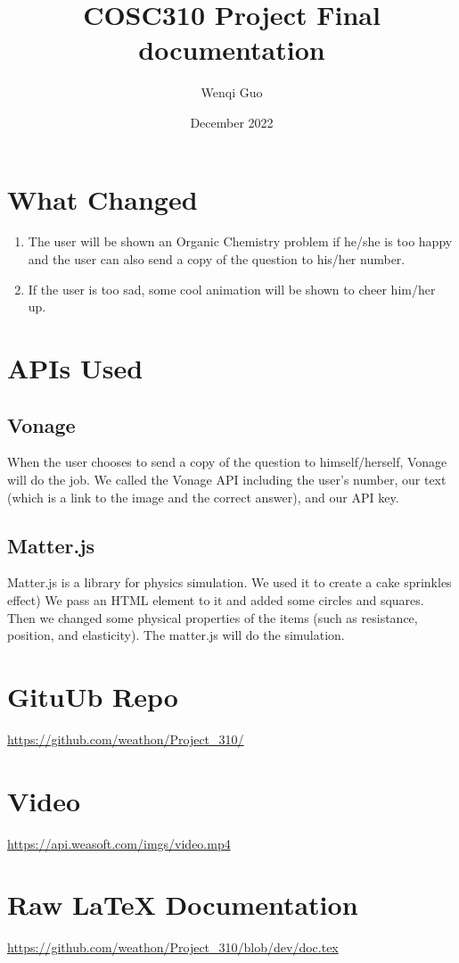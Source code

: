 \documentclass{article}
\title{COSC310 Project Final documentation}
\author{Wenqi Guo}
\date{December 2022}
\begin{document}
\maketitle

\section{What Changed}
\begin{enumerate}
\item The user will be shown an Organic Chemistry problem if he/she is too happy and the user can also send 
a copy of the question to his/her number.
\item If the user is too sad, some cool animation will be shown to cheer him/her up.
\end{enumerate}
\section{APIs Used}
\subsection{Vonage}
When the user chooses to send a copy of the question to himself/herself, Vonage will do the job. We called the Vonage API including the user's number, our text (which is a link to the image and the correct answer), and our API key.
\subsection{Matter.js}
Matter.js is a library for physics simulation. We used it to create a cake sprinkles effect) We pass an HTML element to it and added some circles and squares. Then we changed some physical properties of the items (such as resistance, position, and elasticity). The matter.js will do the simulation. 
\section{GituUb Repo}
\url{https://github.com/weathon/Project_310/}
\section{Video}
\url{https://api.weasoft.com/imgs/video.mp4}
\section{Raw \LaTeX\; Documentation}
\url{https://github.com/weathon/Project_310/blob/dev/doc.tex}
\end{document}
